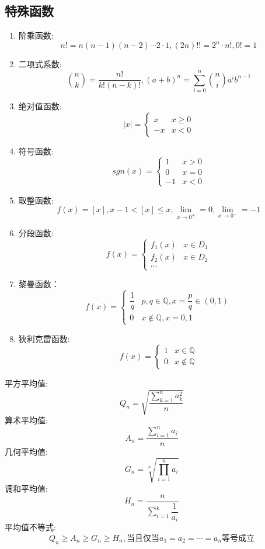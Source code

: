 \subsection{特殊函数}
\begin{definition}[特殊函数]
	\begin{enumerate}
		\item 阶乘函数: $$n!=n(n-1)(n-2)\cdots 2\cdot 1, (2n)!! = 2^{n}\cdot n!, 0! = 1$$
		\item 二项式系数: $$\binom{n}{k}=\dfrac{n!}{k!(n-k)!}, (a+b)^{n} = \sum\limits_{i = 0}^{n}\binom{n}{i}a^{i}b^{n-i}$$
		\item 绝对值函数: $$|x|=\begin{cases} x & x\geq 0 \\ -x & x<0 \end{cases}$$
		\item 符号函数: $$sgn(x)=\begin{cases} 1 & x>0 \\ 0 & x=0 \\ -1 & x<0 \end{cases}$$%
		\item 取整函数: $$f(x) = [x], x-1< [x] \leq x, \lim\limits_{x\to 0^{+}} = 0, \lim\limits_{x\to 0^{-}} =-1$$
		\item 分段函数: $$f(x)=\begin{cases} f_{1}(x) & x\in D_{1} \\ f_{2}(x) & x\in D_{2} \\ \cdots \end{cases}$$
		\item 黎曼函数：$$f(x)=\begin{cases} \dfrac{1}{q} & p,q\in \mathbb{Q}, x = \dfrac{p}{q}\in(0,1) \\ 0 & x\notin \mathbb{Q}, x=0,1 \end{cases}$$
		\item 狄利克雷函数: $$f(x)=\begin{cases} 1 & x\in \mathbb{Q} \\ 0 & x\notin \mathbb{Q} \end{cases}$$
	\end{enumerate}
\end{definition}


\begin{theorem}[平均值不等式 $a_{i} > 0$]
	平方平均值:
	$$Q_{n}=\sqrt{\dfrac{\sum\limits_{k=1}^{n}a_{k}^{2}}{n}}$$
	算术平均值:
	$$A_{n}=\dfrac{\sum\limits_{i=1}^{n}a_{i}}{n}$$
	几何平均值:
	$$G_{n}=\sqrt[n]{\prod\limits_{i=1}^{n}a_{i}}$$
	调和平均值:
	$$H_{n}=\dfrac{n}{\sum\limits_{i=1}^{k}\dfrac{1}{a_{i}}}$$
	平均值不等式:
	$$Q_{n}\geq A_{n}\geq G_{n}\geq H_{n}, \text{当且仅当} a_{1} = a_{2} = \cdots = a_{n} \text{等号成立}$$
\end{theorem}

